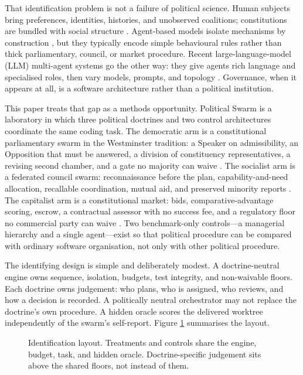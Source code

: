 \documentclass[11pt,a4paper]{article}
\begin{document}
That identification problem is not a failure of political science. Human subjects bring
preferences, identities, histories, and unobserved coalitions; constitutions are bundled
with social structure \citep{pierson2000,greif2006}. Agent-based models isolate mechanisms
by construction \citep{axelrod1984,cederman1997,epstein1999}, but they typically encode
simple behavioural rules rather than thick parliamentary, council, or market procedure.
Recent large-language-model (LLM) multi-agent systems go the other way: they give agents
rich language and specialised roles, then vary models, prompts, and topology
\citep{qian2024,hong2024,wu2023}. Governance, when it appears at all, is a software
architecture rather than a political institution.

This paper treats that gap as a methods opportunity. Political Swarm
\citep{carr2026} is a laboratory in which three political doctrines and two control
architectures coordinate the same coding task. The democratic arm is a constitutional
parliamentary swarm in the Westminster tradition: a Speaker on admissibility, an Opposition
that must be answered, a division of constituency representatives, a revising second
chamber, and a gate no majority can waive \citep{bagehot1867,dicey1885}. The socialist arm
is a federated council swarm: reconnaissance before the plan, capability-and-need
allocation, recallable coordination, mutual aid, and preserved minority reports
\citep{marx1871,pannekoek1950,cole1920,kropotkin1902}. The capitalist arm is a
constitutional market: bids, comparative-advantage scoring, escrow, a contractual
assessor with no success fee, and a regulatory floor no commercial party can waive
\citep{hayek1945,coase1937,roth2002}. Two benchmark-only controls---a managerial hierarchy
and a single agent---exist so that political procedure can be compared with ordinary
software organisation, not only with other political procedure.

The identifying design is simple and deliberately modest. A doctrine-neutral engine owns
sequence, isolation, budgets, test integrity, and non-waivable floors. Each doctrine owns
judgement: who plans, who is assigned, who reviews, and how a decision is recorded. A
politically neutral orchestrator may not replace the doctrine's own procedure. A hidden
oracle scores the delivered worktree independently of the swarm's self-report. Figure
\ref{fig:identification} summarises the layout.

\begin{figure}[t]
\centering
\resizebox{\linewidth}{!}{}
\caption{Identification layout. Treatments and controls share the engine, budget, task,
and hidden oracle. Doctrine-specific judgement sits above the shared floors, not instead
of them.}
\label{fig:identification}
\end{figure}
\end{document}
